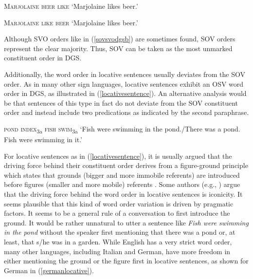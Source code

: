 \begin{exe}
\ex\label{sovsvodgsa}
\textsc{Marjolaine beer like}
\glt `Marjolaine likes beer.'\label{sovsvodgsaaba}
\end{exe}

\begin{exe}
\ex\label{sovsvodgsb}
\textsc{Marjolaine like beer}
\glt `Marjolaine likes beer.'
\end{exe}


\noindent Although SVO orders like in (\ref{sovsvodgsb}) are sometimes found, SOV orders represent the clear majority. Thus, SOV can be taken as the most unmarked constituent order in DGS.%

Additionally, the word order in locative sentences usually deviates from the SOV order. As in many other sign languages, locative sentences exhibit an OSV word order in DGS, as illustrated in (\ref{locativesentence}). An alternative analysis would be that sentences of this type in fact do not deviate from the SOV constituent order and instead include two predications as indicated by the second paraphrase. 

\begin{exe}
\ex \textsc{pond index}\textsubscript{3a} \textsc{fish swim}\textsubscript{3a}
\glt `Fish were swimming in the pond./There was a pond. Fish were swimming in it.' \label{locativesentence}
\end{exe}

\largerpage
\noindent For locative sentences as in (\ref{locativesentence}), it is usually argued that the driving force behind their constituent order derives from a figure-ground principle which states that grounds (bigger and more immobile referents) are introduced before figures (smaller and more mobile) referents \citep{volterra1984italian,kimmelman2012word,pfau2016simple}. Some authors (e.g., \citealt{perniss2007space, ozyurek2010locative}) argue that the driving force behind the word order in locative sentences is iconicity. It seems plausible that this kind of word order variation is driven by pragmatic factors. It seems to be a general rule of a conversation to first introduce the ground. It would be rather unnatural to utter a sentence like \textit{Fish were swimming in the pond} without the speaker first mentioning that there was a pond or, at least, that s/he was in a garden. While English has a very strict word order, many other languages, including Italian and German, have more freedom in either mentioning the ground or the figure first in locative sentences, as shown for German in (\ref{germanlocative}).

